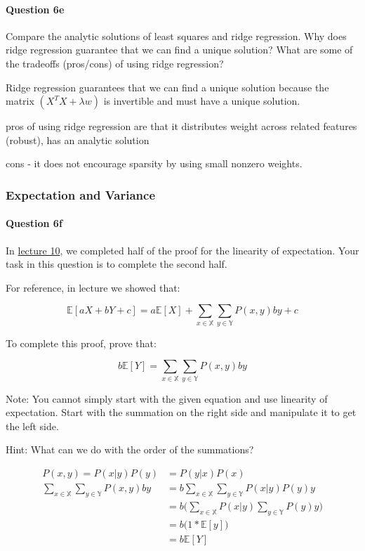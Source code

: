 \documentclass[11pt]{article}
\begin{document}
    \paragraph{Question 6e}\label{question-6e}

Compare the analytic solutions of least squares and ridge regression.
Why does ridge regression guarantee that we can find a unique solution?
What are some of the tradeoffs (pros/cons) of using ridge regression?

    Ridge regression guarantees that we can find a unique solution because
the matrix \((X^T X + \lambda w)\) is invertible and must have a unique
solution.

pros of using ridge regression are that it distributes weight across
related features (robust), has an analytic solution

cons - it does not encourage sparsity by using small nonzero weights.

    \subsubsection{Expectation and Variance}\label{expectation-and-variance}

\paragraph{Question 6f}\label{question-6f}

In \href{http://www.ds100.org/fa18/syllabus\#lecture-week-6}{lecture
10}, we completed half of the proof for the linearity of expectation.
Your task in this question is to complete the second half.

For reference, in lecture we showed that:

\[\mathbb{E}[aX + bY + c] = a\mathbb{E}[X] + \sum_{x \in \mathbb{X}}\sum_{y \in \mathbb{Y}}P(x, y)by + c\]

To complete this proof, prove that:

\[b\mathbb{E}[Y] = \sum_{x \in \mathbb{X}}\sum_{y \in \mathbb{Y}}P(x, y)by\]

Note: You cannot simply start with the given equation and use linearity
of expectation. Start with the summation on the right side and
manipulate it to get the left side.

Hint: What can we do with the order of the summations?

    \[
\begin{aligned}
P(x,y) = P(x|y) P(y) &= P(y|x) P(x) \\
\sum_{x \in \mathbb{X}}\sum_{y \in \mathbb{Y}}P(x, y) by &= b \sum_{x \in \mathbb{X}}\sum_{y \in \mathbb{Y}}P(x|y) P(y) y \\
&= b \big(\sum_{x \in \mathbb{X}} P(x|y) \sum_{y \in \mathbb{Y}}P(y) y \big) \\
&= b \big(1 * \mathbb{E}[y]) \\
&= b\mathbb{E}[Y]
\end{aligned}
\]
\end{document}
